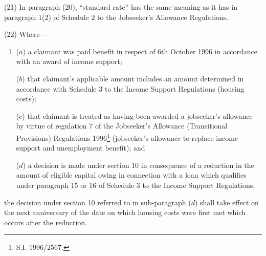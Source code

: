 \documentclass[12pt,a4paper]{article}
\begin{document}
(21) In paragraph (20), “standard rate” has the same meaning as it has in paragraph 1(2) of Schedule 2 to the Jobseeker’s Allowance Regulations.

(22) Where—
\begin{enumerate}\item[]
($a$) a claimant was paid benefit in respect of 6th October 1996 in accordance with an award of income support;

($b$) that claimant’s applicable amount includes an amount determined in accordance with Schedule 3 to the Income Support Regulations (housing costs);

($c$) that claimant is treated as having been awarded a jobseeker’s allowance by virtue of regulation 7 of the Jobseeker’s Allowance (Transitional Provisions) Regulations 1996\footnote{\frenchspacing S.I. 1996/2567.} (jobseeker’s allowance to replace income support and unemployment benefit); and

($d$) a decision is made under section 10 in consequence of a reduction in the amount of eligible capital owing in connection with a loan which qualifies under paragraph 15 or 16 of Schedule 3 to the Income Support Regulations,
\end{enumerate}
the decision under section 10 referred to in sub-paragraph ($d$) shall take effect on the next anniversary of the date on which housing costs were first met which occurs after the reduction.

\end{document}
